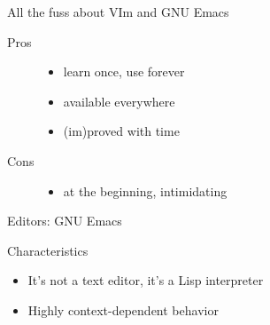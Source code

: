 \documentclass[10pt]{beamer}
\begin{document}
\begin{frame}{All the fuss about VIm and GNU Emacs} %

	\large
	\begin{description}
		\item[Pros]
			\begin{itemize}
				\item learn once, use forever
				\item available everywhere
				\item (im)proved with time
			\end{itemize}
		\item[Cons]
			\begin{itemize}
				\item at the beginning, intimidating
			\end{itemize}
	\end{description}

\end{frame}

\begin{frame}{Editors: GNU Emacs} %
	\large
	\begin{block}{Characteristics}
		\begin{itemize}
			\item It's not a text editor, it's a Lisp interpreter
			\item Highly context-dependent behavior
		\end{itemize}
	\end{block}

\end{frame}

\end{document}

